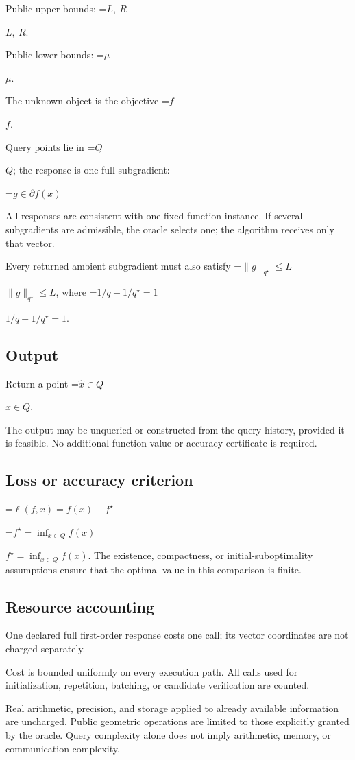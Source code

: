 \documentclass[10pt,a4paper]{article}
\newcommand{\AtlasMath}[1]{\par\begingroup\centering\setbox0=\hbox{$\displaystyle #1$}\ifdim\wd0>1.4\linewidth\typeout{ATLAS WIDE FORMULA: \the\wd0}\fi\ifdim\wd0>\linewidth\resizebox{\linewidth}{!}{\box0}\else\box0\fi\par\endgroup}
\newcommand{\AtlasInlineMath}[1]{\begingroup\setbox0=\hbox{$#1$}\ifdim\wd0>.4\linewidth\endgroup\AtlasMath{#1}\else\endgroup$#1$\fi}
\begin{document}
Public upper bounds: \AtlasInlineMath{L,\ R}.

Public lower bounds: \AtlasInlineMath{\mu}.

The unknown object is the objective \AtlasInlineMath{f}.

Query points lie in \AtlasInlineMath{Q}; the response is one full subgradient:


\AtlasMath{g\in\partial f(x)}


All responses are consistent with one fixed function instance. If several subgradients are admissible, the oracle selects one; the algorithm receives only that vector.

Every returned ambient subgradient must also satisfy \AtlasInlineMath{\|g\|_{q^\star}\le L}, where \AtlasInlineMath{1/q+1/q^\star=1}.

\subsection{Output}
Return a point \AtlasInlineMath{\widehat x\in Q}.

The output may be unqueried or constructed from the query history, provided it is feasible. No additional function value or accuracy certificate is required.

\subsection{Loss or accuracy criterion}

\AtlasMath{\ell(f,x)=f(x)-f^\star}


\AtlasInlineMath{f^\star=\inf_{x\in Q}f(x)}. The existence, compactness, or initial-suboptimality assumptions ensure that the optimal value in this comparison is finite.

\subsection{Resource accounting}
One declared full first-order response costs one call; its vector coordinates are not charged separately.

Cost is bounded uniformly on every execution path. All calls used for initialization, repetition, batching, or candidate verification are counted.

Real arithmetic, precision, and storage applied to already available information are uncharged. Public geometric operations are limited to those explicitly granted by the oracle. Query complexity alone does not imply arithmetic, memory, or communication complexity.
\end{document}
